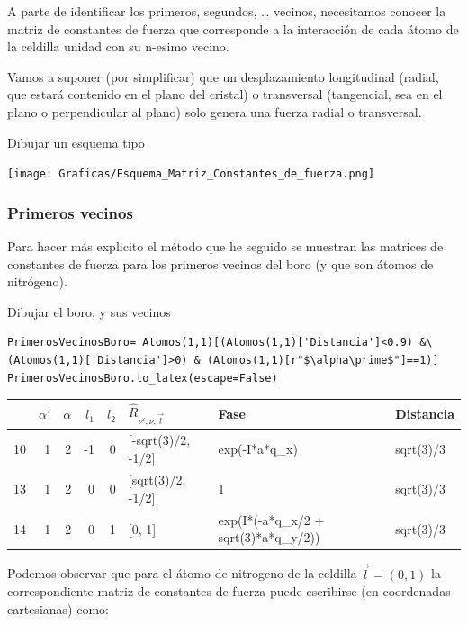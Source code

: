 \documentclass[12pt,a4paper]{article}
\begin{document}
A parte de identificar los primeros, segundos, \ldots{} vecinos, necesitamos conocer la matriz de constantes de fuerza que corresponde a la interacción de cada átomo de la celdilla unidad con su n-esimo vecino.

Vamos a suponer (por simplificar) que un desplazamiento longitudinal (radial, que estará contenido en el plano del cristal) o transversal (tangencial, sea en el plano o perpendicular al plano) solo genera una fuerza radial o transversal.

\color{red}
Dibujar un esquema tipo
\begin{center}
\texttt{[image: Graficas/Esquema\_Matriz\_Constantes\_de\_fuerza.png]}
\end{center}
\normalcolor
\subsubsection{Primeros vecinos}
\label{sec:org89e669a}
Para hacer más explicito el método que he seguido se muestran las matrices de constantes de fuerza para los primeros vecinos del boro (y que son átomos de nitrógeno).

\color{red} 
Dibujar el boro, y sus vecinos 
\normalcolor

\begin{verbatim}
PrimerosVecinosBoro= Atomos(1,1)[(Atomos(1,1)['Distancia']<0.9) &\
(Atomos(1,1)['Distancia']>0) & (Atomos(1,1)[r"$\alpha\prime$"]==1)]
PrimerosVecinosBoro.to_latex(escape=False)
\end{verbatim}

\begin{tabular}{lrrrrlll}
\toprule
{} &  $\alpha\prime$ &  $\alpha$ &  $l_1$ &  $l_2$ & $\hat R_{\nu\prime,\nu,\vec l}$ &                                 Fase &  Distancia \\
\midrule
10 &               1 &         2 &     -1 &      0 &              [-sqrt(3)/2, -1/2] &                        exp(-I*a*q_x) &  sqrt(3)/3 \\
13 &               1 &         2 &      0 &      0 &               [sqrt(3)/2, -1/2] &                                    1 &  sqrt(3)/3 \\
14 &               1 &         2 &      0 &      1 &                          [0, 1] &  exp(I*(-a*q_x/2 + sqrt(3)*a*q_y/2)) &  sqrt(3)/3 \\
\bottomrule
\end{tabular}

Podemos observar que para el átomo de nitrogeno de la celdilla \(\vec l = (0,1)\) la correspondiente matriz de constantes de fuerza puede escribirse (en coordenadas cartesianas) como:
\end{document}
